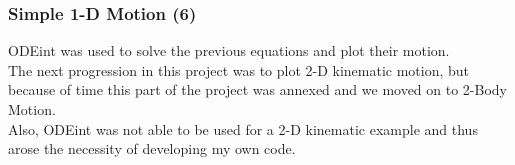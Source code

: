 \documentclass{beamer}
\begin{document}
\begin{frame}
\frametitle{Simple 1-D Motion (6)}
ODEint was used to solve the previous equations and plot their motion.\\
\vspace{20pt}
The next progression in this project was to plot 2-D kinematic motion, but because of time this part of the project was annexed and we moved on to 2-Body Motion.\\
\vspace{20pt}
Also, ODEint was not able to be used for a 2-D kinematic example and thus arose the necessity of developing my own code.
\end{frame}
\end{document}
